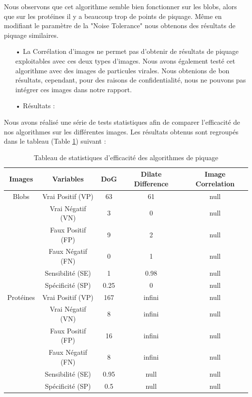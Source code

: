 Nous observons que cet algorithme semble bien fonctionner sur les blobs, alors que sur les protéines il y a beaucoup trop de points de piquage. Même en modifiant le paramètre de la "Noise Tolerance" nous obtenons des résultats de piquage similaires. \\

\begin{itemize}
\item[•] La Corrélation d'images ne permet pas d'obtenir de résultats de piquage exploitables avec ces deux types d'images. Nous avons également testé cet algorithme avec des images de particules virales. Nous obtenions de bon résultats, cependant, pour des raisons de confidentialité, nous ne pouvons pas intégrer ces images dans notre rapport. \\
\end{itemize}

\begin{itemize}
\item[•] Résultats :
\end{itemize}

Nous avons réalisé une série de tests statistiques afin de comparer l'efficacité de nos algorithmes sur les différentes images. Les résultats obtenus sont regroupés dans le tableau (Table \ref{tableau}) suivant :

\begin{table}[h]
\begin{center}
\begin{tabular}{|c|c|c|c|c|}
\hline
\textbf{Images} & \textbf{Variables} & \textbf{DoG} & \textbf{Dilate Difference} & \textbf{Image Correlation} \\
\hline
Blobs & Vrai Positif (VP) & 63 & 61 & null \\
	& Vrai Négatif (VN) & 3 & 0 & null \\
	& Faux Positif (FP) & 9 & 2 & null \\
	& Faux Négatif (FN) & 0 & 1 & null \\
	& Sensibilité (SE) & 1 & 0.98 & null \\
	& Spécificité (SP) & 0.25 & 0 & null \\
\hline
Protéines & Vrai Positif (VP) & 167 & infini & null \\
	& Vrai Négatif (VN) & 8 & infini & null \\
	& Faux Positif (FP) & 16 & infini & null \\
	& Faux Négatif (FN) & 8 & infini & null \\
	& Sensibilité (SE) & 0.95 & null & null \\
	& Spécificité (SP) & 0.5 & null & null \\
	\hline
\end{tabular}
\end{center}
\caption{Tableau de statistiques d'efficacité des algorithmes de piquage}
\label{tableau}
\end{table}

